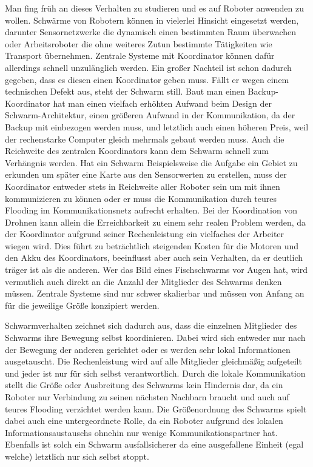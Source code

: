 Man fing früh an dieses Verhalten zu studieren und es auf Roboter anwenden zu wollen. Schwärme von Robotern können in vielerlei Hinsicht eingesetzt werden, darunter Sensornetzwerke die dynamisch einen bestimmten Raum überwachen oder Arbeitsroboter die ohne weiteres Zutun bestimmte Tätigkeiten wie Transport übernehmen.
Zentrale Systeme mit Koordinator können dafür allerdings schnell unzulänglich werden. Ein großer Nachteil ist schon dadurch gegeben, dass es diesen einen Koordinator geben muss. Fällt er wegen einem technischen Defekt aus, steht der Schwarm still. Baut man einen Backup-Koordinator hat man einen vielfach erhöhten Aufwand beim Design der Schwarm-Architektur, einen größeren Aufwand in der Kommunikation, da der Backup mit einbezogen werden muss, und letztlich auch einen höheren Preis, weil der rechenstarke Computer gleich mehrmals gebaut werden muss.
Auch die Reichweite des zentralen Koordinators kann dem Schwarm schnell zum Verhängnis werden. Hat ein Schwarm Beispielsweise die Aufgabe ein Gebiet zu erkunden um später eine Karte aus den Sensorwerten zu erstellen, muss der Koordinator entweder stets in Reichweite aller Roboter sein um mit ihnen kommunizieren zu können oder er muss die Kommunikation durch teures Flooding im Kommunikationsnetz aufrecht erhalten. Bei der Koordination von Drohnen kann allein die Erreichbarkeit zu einem sehr realen Problem werden, da der Koordinator aufgrund seiner Rechenleistung ein vielfaches der Arbeiter wiegen wird. Dies führt zu beträchtlich steigenden Kosten für die Motoren und den Akku des Koordinators, beeinflusst aber auch sein Verhalten, da er deutlich träger ist als die anderen.
Wer das Bild eines Fischschwarms vor Augen hat, wird vermutlich auch direkt an die Anzahl der Mitglieder des Schwarms denken müssen. Zentrale Systeme sind nur schwer skalierbar und müssen von Anfang an für die jeweilige Größe konzipiert werden.

Schwarmverhalten zeichnet sich dadurch aus, dass die einzelnen Mitglieder des Schwarms ihre Bewegung selbst koordinieren. Dabei wird sich entweder nur nach der Bewegung der anderen gerichtet oder es werden sehr lokal Informationen ausgetauscht. Die Rechenleistung wird auf alle Mitglieder gleichmäßig aufgeteilt und jeder ist nur für sich selbst verantwortlich. Durch die lokale Kommunikation stellt die Größe oder Ausbreitung des Schwarms kein Hindernis dar, da ein Roboter nur Verbindung zu seinen nächsten Nachbarn braucht und auch auf teures Flooding verzichtet werden kann. Die Größenordnung des Schwarms spielt dabei auch eine untergeordnete Rolle, da ein Roboter aufgrund des lokalen Informationsaustauschs ohnehin nur wenige Kommunikationspartner hat. Ebenfalls ist solch ein Schwarm ausfallsicherer da eine ausgefallene Einheit (egal welche) letztlich nur sich selbst stoppt. 

